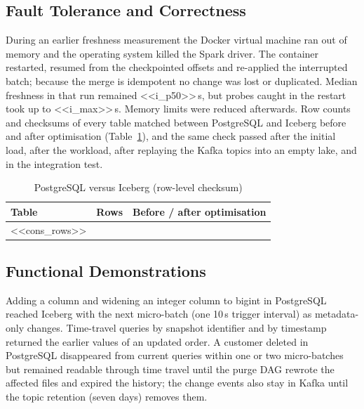 \documentclass[conference,a4paper]{IEEEtran}
\begin{document}
\subsection{Fault Tolerance and Correctness}
During an earlier freshness measurement the Docker virtual machine ran out of memory and the operating system killed
the Spark driver. The container restarted, resumed from the checkpointed offsets and re-applied the interrupted
batch; because the merge is idempotent no change was lost or duplicated. Median freshness in that run remained
<<i_p50>>\,s, but probes caught in the restart took up to <<i_max>>\,s. Memory limits were reduced afterwards. Row
counts and checksums of every table matched between PostgreSQL and Iceberg before and after optimisation
(Table~\ref{tab:cons}), and the same check passed after the initial load, after the workload, after replaying the
Kafka topics into an empty lake, and in the integration test.

\begin{table}[t]
\caption{PostgreSQL versus Iceberg (row-level checksum)}
\label{tab:cons}
\centering
\footnotesize
\begin{tabular}{@{}lrl@{}}
\toprule
Table & Rows & Before / after optimisation \\
\midrule
<<cons_rows>>
\bottomrule
\end{tabular}
\end{table}

\subsection{Functional Demonstrations}
Adding a column and widening an integer column to bigint in PostgreSQL reached Iceberg with the next
micro-batch (one 10\,s trigger interval) as metadata-only changes. Time-travel queries by snapshot identifier and by timestamp returned the earlier values of an
updated order. A customer deleted in PostgreSQL disappeared from current queries within one or two micro-batches but remained
readable through time travel until the purge DAG rewrote the affected files and expired the history; the change
events also stay in Kafka until the topic retention (seven days) removes them.
\end{document}
